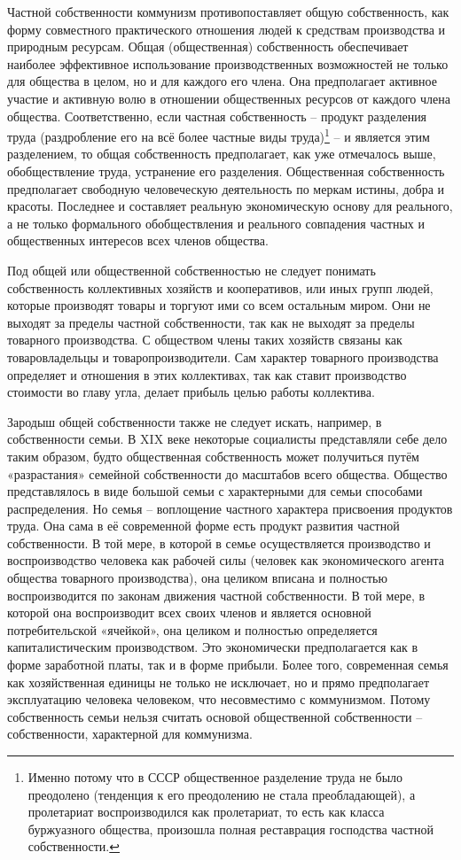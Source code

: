 \documentclass[12pt,a4paper,openany]{book}
\begin{document}
Частной собственности коммунизм противопоставляет общую собственность, как форму совместного практического отношения людей к средствам производства и природным ресурсам. Общая (общественная) собственность обеспечивает наиболее эффективное использование производственных возможностей не только для общества в целом, но и для каждого его члена. Она предполагает активное участие и активную волю в отношении общественных ресурсов от каждого члена общества. Соответственно, если частная собственность – продукт разделения труда (раздробление его на всё более частные виды труда)\footnote{Именно потому что в СССР общественное разделение труда не было преодолено (тенденция к его преодолению не стала преобладающей), а пролетариат воспроизводился как пролетариат, то есть как класса буржуазного общества, произошла полная реставрация господства частной собственности.} – и является этим разделением, то общая собственность предполагает, как уже отмечалось выше, обобществление труда, устранение его разделения. Общественная собственность предполагает свободную человеческую деятельность по меркам истины, добра и красоты. Последнее и составляет реальную экономическую основу для реального, а не только формального обобществления и реального совпадения частных и общественных интересов всех членов общества.

Под общей или общественной собственностью не следует понимать собственность коллективных хозяйств и кооперативов, или иных групп людей, которые производят товары и торгуют ими со всем остальным миром. Они не выходят за пределы частной собственности, так как не выходят за пределы товарного производства. С обществом члены таких хозяйств связаны как товаровладельцы и товаропроизводители. Сам характер товарного производства определяет и отношения в этих коллективах, так как ставит производство стоимости во главу угла, делает прибыль целью работы коллектива.

Зародыш общей собственности также не следует искать, например, в собственности семьи. В XIX веке некоторые социалисты представляли себе дело таким образом, будто общественная собственность может получиться путём «разрастания» семейной собственности до масштабов всего общества. Общество представлялось в виде большой семьи с характерными для семьи способами распределения. Но семья – воплощение частного характера присвоения продуктов труда. Она сама в её современной форме есть продукт развития частной собственности. В той мере, в которой в семье осуществляется производство и воспроизводство человека как рабочей силы (человек как экономического агента общества товарного производства), она целиком вписана и полностью воспроизводится по законам движения частной собственности. В той мере, в которой она воспроизводит всех своих членов и является основной потребительской «ячейкой», она целиком и полностью определяется капиталистическим производством. Это экономически предполагается как в форме заработной платы, так и в форме прибыли. Более того, современная семья как хозяйственная единицы не только не исключает, но и прямо предполагает эксплуатацию человека человеком, что несовместимо с коммунизмом. Потому собственность семьи нельзя считать основой общественной собственности – собственности, характерной для коммунизма.
\end{document}
